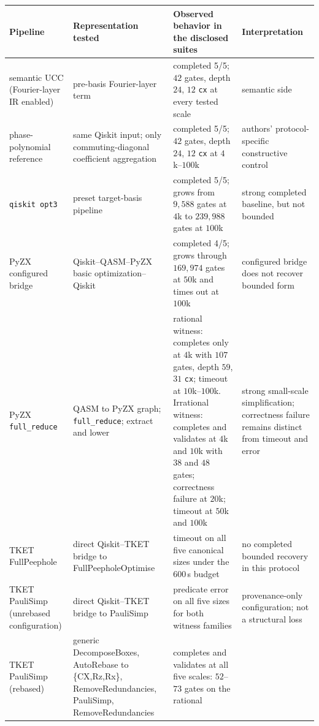 \begin{table}[t]
\centering
\scriptsize
\begin{tabularx}{\textwidth}{@{}>{\raggedright\arraybackslash}p{}
                >{\raggedright\arraybackslash}p{}
                >{\raggedright\arraybackslash}X
                >{\raggedright\arraybackslash}p{}@{}}
\toprule
Pipeline & Representation tested & Observed behavior in the disclosed suites & Interpretation \\
\midrule
semantic UCC (Fourier-layer IR enabled)
& pre-basis Fourier-layer term
& completed 5/5; $42$ gates, depth $24$, $12$ \texttt{cx} at every tested scale
& semantic side \\
phase-polynomial reference
& same Qiskit input; only commuting-diagonal coefficient aggregation
& completed 5/5; $42$ gates, depth $24$, $12$ \texttt{cx} at $4$k--$100$k
& authors' protocol-specific constructive control \\
\texttt{qiskit opt3}
& preset target-basis pipeline
& completed 5/5; grows from $9{,}588$ gates at $4$k to $239{,}988$ gates at $100$k
& strong completed baseline, but not bounded \\
PyZX configured bridge
& Qiskit--QASM--PyZX basic optimization--Qiskit
& completed 4/5; grows through $169{,}974$ gates at $50$k and times out at $100$k
& configured bridge does not recover bounded form \\
PyZX \texttt{full\_reduce}
& QASM to PyZX graph; \texttt{full\_reduce}; extract and lower
& rational witness: completes only at $4$k with $107$ gates, depth $59$, $31$
\texttt{cx}; timeout at $10$k--$100$k. Irrational witness: completes and
validates at $4$k and $10$k with $38$ and $48$ gates; correctness failure at
$20$k; timeout at $50$k and $100$k
& strong small-scale simplification; correctness failure remains distinct from timeout and error \\
TKET FullPeephole
& direct Qiskit--TKET bridge to FullPeepholeOptimise
& timeout on all five canonical sizes under the 600\,s budget
& no completed bounded recovery in this protocol \\
TKET PauliSimp (unrebased configuration)
& direct Qiskit--TKET bridge to PauliSimp
& predicate error on all five sizes for both witness families
& provenance-only configuration; not a structural loss \\
TKET PauliSimp (rebased)
& generic DecomposeBoxes, AutoRebase to \{CX,Rz,Rx\}, RemoveRedundancies,
PauliSimp, RemoveRedundancies
& completes and validates at all five scales: $52$--$73$ gates on the rational

\end{tabularx}
\end{table}
